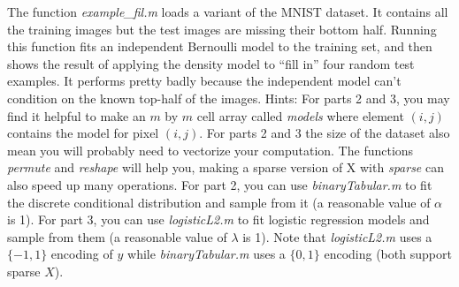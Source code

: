 \documentclass{article}
\begin{document}
The function \emph{example\_fil.m} loads a variant of the MNIST dataset. It contains all the training images but the test images are missing their bottom half. Running this function fits an independent Bernoulli model to the training set, and then shows the result of applying the density model to ``fill in'' four random test examples. It performs pretty badly because the independent model can't condition on the known top-half of the images.
Hints: For parts 2 and 3, you may find it helpful to make an $m$ by $m$ cell array called \emph{models} where element $(i,j)$ contains the model for pixel $(i,j)$. For parts 2 and 3 the size of the dataset also mean you will probably need to vectorize your computation. The functions \emph{permute} and \emph{reshape} will help you, making a sparse version of X with \emph{sparse} can also speed up many operations. For part 2, you can use \emph{binaryTabular.m} to fit the discrete conditional distribution and sample from it (a reasonable value of $\alpha$ is 1). For part 3, you can use \emph{logisticL2.m} to fit logistic regression models and sample from them (a reasonable value of $\lambda$ is 1). Note that \emph{logisticL2.m} uses a $\{-1,1\}$ encoding of $y$ while \emph{binaryTabular.m} uses a $\{0,1\}$ encoding (both support sparse $X$).
\end{document}
